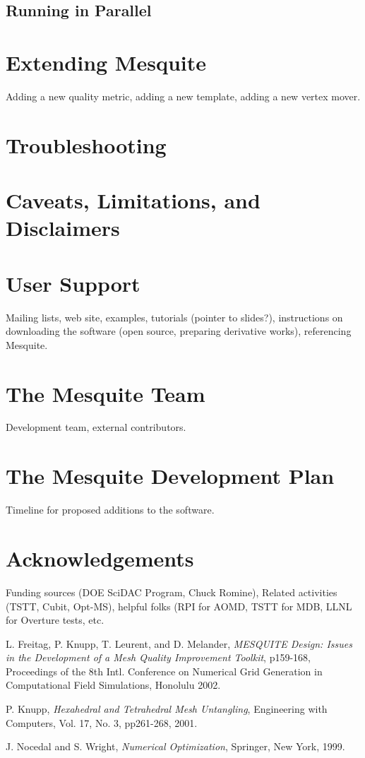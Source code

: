 \subsection{Running in Parallel}

\section{Extending Mesquite}
Adding a new quality metric, adding a new template, adding a new vertex 
mover.

\section{Troubleshooting}

\section{Caveats, Limitations, and Disclaimers}

\section{User Support}
Mailing lists, web site, examples, tutorials (pointer to slides?), 
instructions on downloading the software (open source, preparing 
derivative works), referencing Mesquite.

\section{The Mesquite Team}
Development team, external contributors.

\section{The Mesquite Development Plan}
Timeline for proposed additions to the software.

\section{Acknowledgements}
Funding sources (DOE SciDAC Program, Chuck Romine), Related activities 
(TSTT, Cubit, Opt-MS), helpful folks (RPI for AOMD, TSTT for MDB, 
LLNL for Overture tests, etc.

\begin{thebibliography}{999}
L. Freitag, P. Knupp, T. Leurent, and D. Melander, {\it MESQUITE Design: Issues in the Development of a Mesh Quality Improvement Toolkit}, p159-168, Proceedings of the 8th Intl. Conference on Numerical Grid Generation in Computational Field Simulations, Honolulu 2002.

P. Knupp, {\it Hexahedral and Tetrahedral Mesh Untangling}, Engineering with Computers, Vol. 17, No. 3, pp261-268, 2001.

J. Nocedal and S. Wright, {\it Numerical Optimization}, Springer, New York, 1999.

\end{thebibliography}

